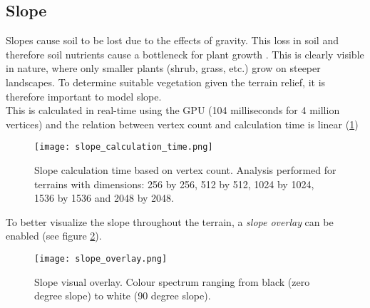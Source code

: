 \subsection{Slope}

Slopes cause soil to be lost due to the effects of gravity. This loss in soil and therefore soil nutrients cause a bottleneck for plant growth \cite{Kapolka2010}. This is clearly visible in nature, where only smaller plants (shrub, grass, etc.) grow on steeper landscapes. To determine suitable vegetation given the terrain relief, it is therefore important to model slope.\\

This is calculated in real-time using the GPU (104 milliseconds for 4 million vertices) and the relation between vertex count and calculation time is linear (\ref{fig:slope_calculation_time})

\begin{figure}
\center
	\texttt{[image: slope\_calculation\_time.png]}
	\caption{ Slope calculation time based on vertex count. Analysis performed for terrains with dimensions: 256 by 256, 512 by 512, 1024 by 1024, 1536 by 1536 and 2048 by 2048.  }
	\label{fig:slope_calculation_time}
\end{figure}

To better visualize the slope throughout the terrain, a \textit{slope overlay} can be enabled (see figure \ref{fig:slope overlay}).

\begin{figure}
\center
	\texttt{[image: slope\_overlay.png]}
	\caption{ Slope visual overlay. Colour spectrum ranging from black (zero degree slope) to white (90 degree slope). }
	\label{fig:slope overlay}
\end{figure}